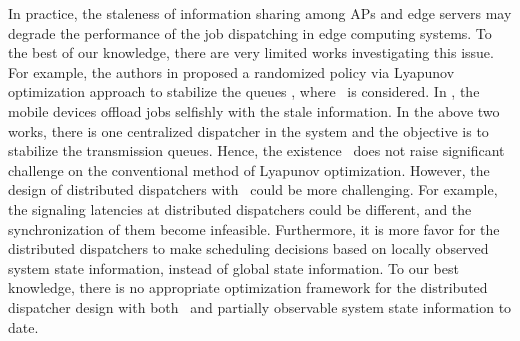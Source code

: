 In practice, the staleness of information sharing among APs and edge servers may degrade the performance of the job dispatching in edge computing systems.
To the best of our knowledge, there are very limited works investigating this issue.
For example, the authors in \cite{JSAC17-LyuX} proposed a randomized policy via Lyapunov optimization approach to stabilize the queues , where \brlatency~is considered. 
In \cite{TWC18-LyuX}, the mobile devices offload jobs selfishly with the stale information.
In the above two works, there is one centralized dispatcher in the system and the objective is to stabilize the transmission queues.
Hence, the existence \brlatency~does not raise significant challenge on the conventional method of Lyapunov optimization.
However, the design of distributed dispatchers with \brlatency~could be more challenging.
For example, the signaling latencies at distributed dispatchers could be different, and the synchronization of them become infeasible.
Furthermore, it is more favor for the distributed dispatchers to make scheduling decisions based on locally observed system state information, instead of global state information.
To our best knowledge, there is no appropriate optimization framework for the distributed dispatcher design with both \brlatency~and partially observable system state information to date.

